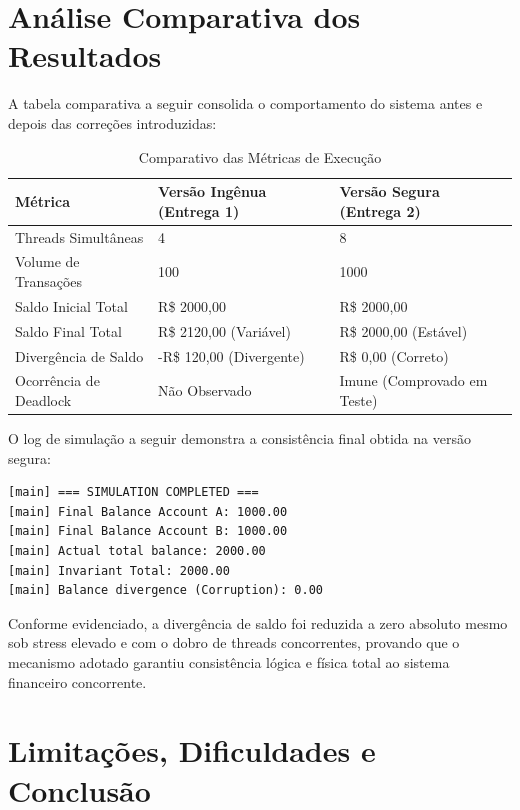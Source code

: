 \documentclass[12pt,a4paper]{article}
\begin{document}
\section{Análise Comparativa dos Resultados}

\noindent A tabela comparativa a seguir consolida o comportamento do sistema antes e depois das correções introduzidas:

\begin{table}[h]
\centering
\caption{Comparativo das Métricas de Execução}
\begin{tabular}{lll}
\toprule
\textbf{Métrica} & \textbf{Versão Ingênua (Entrega 1)} & \textbf{Versão Segura (Entrega 2)} \\
\midrule
Threads Simultâneas & 4 & 8 \\
Volume de Transações & 100 & 1000 \\
Saldo Inicial Total & R\$ 2000,00 & R\$ 2000,00 \\
Saldo Final Total & R\$ 2120,00 (Variável) & R\$ 2000,00 (Estável) \\
Divergência de Saldo & -R\$ 120,00 (Divergente) & R\$ 0,00 (Correto) \\
Ocorrência de Deadlock & Não Observado & Imune (Comprovado em Teste) \\
\bottomrule
\end{tabular}
\end{table}

\noindent O log de simulação a seguir demonstra a consistência final obtida na versão segura:

\begin{lstlisting}[caption={Extrato Final de Execução da Simulação Segura}]
[main] === SIMULATION COMPLETED ===
[main] Final Balance Account A: 1000.00
[main] Final Balance Account B: 1000.00
[main] Actual total balance: 2000.00
[main] Invariant Total: 2000.00
[main] Balance divergence (Corruption): 0.00
\end{lstlisting}

\noindent Conforme evidenciado, a divergência de saldo foi reduzida a zero absoluto mesmo sob stress elevado e com o dobro de threads concorrentes, provando que o mecanismo adotado garantiu consistência lógica e física total ao sistema financeiro concorrente.

\section{Limitações, Dificuldades e Conclusão}
\end{document}
